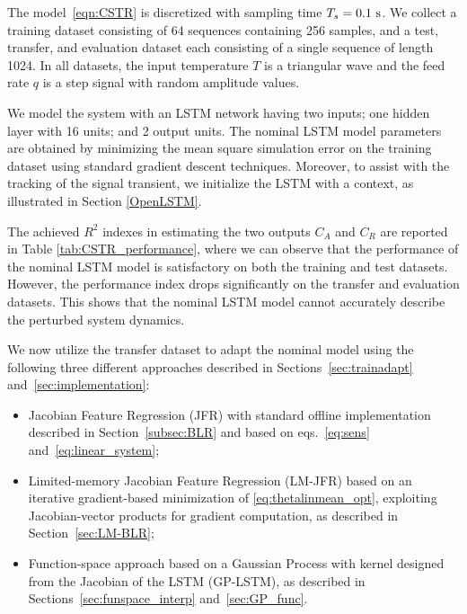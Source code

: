 \documentclass{article}
\begin{document}
The model~\eqref{eqn:CSTR}  is discretized with sampling time $T_s = 0.1~\rm{s}$. We collect a training dataset consisting of 64 sequences containing 256 samples, and a test, transfer, and evaluation dataset each consisting of a single sequence of length 1024. In all datasets, the input temperature $T$  is a triangular wave and the feed rate $q$ is a step signal with random amplitude values. 


We model the system with an LSTM network \cite{hochreiter1997a,greff_lstm_2017} having two inputs; one hidden layer with 16 units; and 2 output units. The nominal LSTM model parameters are obtained by minimizing the mean square simulation error on the training dataset using standard gradient descent techniques. Moreover, to assist with the tracking of the signal transient, we initialize the LSTM with a context, as illustrated in Section \ref{OpenLSTM}. 

The achieved $R^2$ indexes in estimating the two outputs $C_A$ and $C_R$ are  reported in Table \ref{tab:CSTR_performance}, where we can observe that the performance of the nominal LSTM model is satisfactory on both the training and test datasets. However, the performance index drops significantly on the transfer and evaluation datasets. This shows that the nominal LSTM model cannot accurately describe the perturbed system dynamics. 


We now utilize the transfer dataset to adapt the nominal model using the following three different approaches described in Sections~\ref{sec:trainadapt}  and~\ref{sec:implementation}: 
\begin{itemize}
    \item Jacobian Feature Regression (JFR) with standard offline implementation described in Section~\ref{subsec:BLR} 
    and based on  eqs.~\eqref{eq:sens} and~\eqref{eq:linear_system};
    \item Limited-memory Jacobian Feature Regression (LM-JFR) based on an iterative gradient-based minimization of \eqref{eq:thetalinmean_opt}, exploiting Jacobian-vector products for gradient computation, as described in Section~\ref{sec:LM-BLR};
    \item Function-space approach based on a Gaussian Process with  kernel designed from the Jacobian of the LSTM (GP-LSTM), as described in Sections~\ref{sec:funspace_interp} and~\ref{sec:GP_func}. 
\end{itemize}
\end{document}
